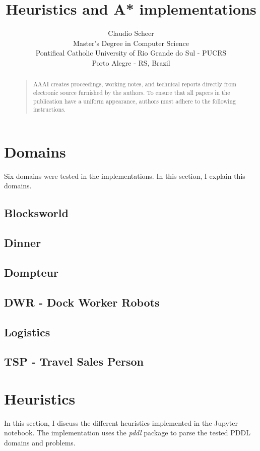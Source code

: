 \documentclass[letterpaper]{article}
\begin{document}
\title{Heuristics and A* implementations}
\author{Claudio Scheer\\
  Master's Degree in Computer Science\\
  Pontifical Catholic University of Rio Grande do Sul - PUCRS\\
  Porto Alegre - RS, Brazil\\
}
\maketitle
\begin{abstract}
  \begin{quote}
    AAAI creates proceedings, working notes, and technical reports directly from electronic source furnished by the authors. To ensure that all papers in the publication have a uniform appearance, authors must adhere to the following instructions.
  \end{quote}
\end{abstract}


\section{Domains}
Six domains were tested in the implementations. In this section, I explain this domains.

\subsection{Blocksworld}
\subsection{Dinner}
\subsection{Dompteur}
\subsection{DWR - Dock Worker Robots}
\subsection{Logistics}
\subsection{TSP - Travel Sales Person}


\section{Heuristics}
In this section, I discuss the different heuristics implemented in the Jupyter notebook. The implementation uses the \textit{pddl} package to parse the tested PDDL domains and problems.
\end{document}
